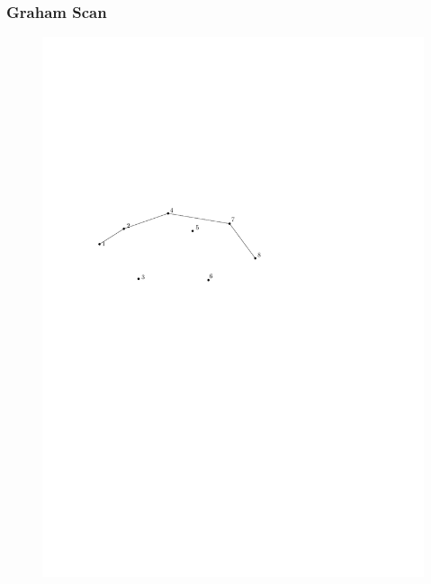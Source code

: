 \begin{frame}
	\frametitle{{Graham Scan}}
\begin{figure}[htbp]
	\begin{center}
  	\includegraphics[width=.8\linewidth]{bilder/graham9}
	\end{center}
\end{figure}
\end{frame}

